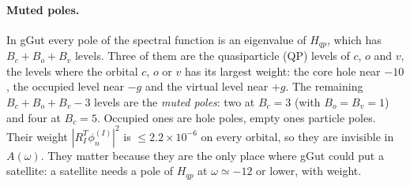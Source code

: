 \documentclass[11pt]{article}
\begin{document}
\paragraph{Muted poles.} In gGut every pole of the spectral function is an eigenvalue of $H_{qp}$, which has $B_c+B_o+B_v$ levels. Three of them are the quasiparticle (QP) levels of $c$, $o$ and $v$, the levels where the orbital $c$, $o$ or $v$ has its largest weight: the core hole near $-10$, the occupied level near $-g$ and the virtual level near $+g$.
The remaining $B_c+B_o+B_v-3$ levels are the \emph{muted poles}: two at $B_c=3$ (with $B_o=B_v=1$) and four at $B_c=5$. Occupied ones are hole poles, empty ones particle poles. Their weight $|R_I^T\phi^{(I)}_n|^2$ is $\le2.2\times10^{-6}$ on every orbital, so they are invisible in $A(\omega)$.
They matter because they are the only place where gGut could put a satellite: a satellite needs a pole of $H_{qp}$ at $\omega\simeq-12$ or lower, with weight.
\end{document}
